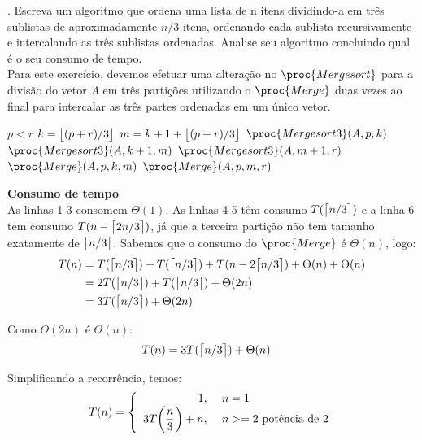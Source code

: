 . Escreva um algoritmo que ordena uma lista de n itens dividindo-a em três sublistas de aproximadamente $n/3$ itens, ordenando cada sublista recursivamente e intercalando as três sublistas ordenadas. Analise seu algoritmo concluindo qual é o seu consumo de tempo.\\[6pt]
Para este exercício, devemos efetuar uma alteração no $\proc{Mergesort}$ para a divisão do vetor $A$ em três partições utilizando o $\proc{Merge}$ duas vezes ao final para intercalar as três partes ordenadas em um único vetor.

\begin{codebox}
\li    \If $p < r$
\li         \Then
            $k = \big\lfloor(p + r) / 3\big\rfloor$
\li         $m = k+1 + \big\lfloor(p + r) / 3\big\rfloor$
\li         $\proc{Mergesort3}(A, p, k)$
\li         $\proc{Mergesort3}(A, k + 1, m)$
\li         $\proc{Mergesort3}(A, m + 1, r)$
\li         $\proc{Merge}(A, p, k, m)$
\li         $\proc{Merge}(A, p, m, r)$
            \End
\End
\end{codebox}

\textbf{Consumo de tempo}\\[6pt]
As linhas 1-3 consomem $\Theta(1)$. As linhas 4-5 têm consumo $T(\big\lceil n / 3\big\rceil)$ e a linha 6 tem consumo $T(n - \big\lceil2n / 3\big\rceil)$, já que a terceira partição não tem tamanho exatamente de $\big\lceil n / 3\big\rceil$. Sabemos que o consumo do $\proc{Merge}$ é $\Theta(n)$, logo:\\
\begin{align*}
T(n) & = T(\big\lceil n / 3\big\rceil) + T(\big\lceil n / 3\big\rceil) + T(n - 2\big\lceil n / 3\big\rceil) + \Theta(n) + \Theta(n) \\
& = 2T(\big\lceil n / 3\big\rceil) + T(\big\lceil n / 3\big\rceil) + \Theta(2n) \\
& = 3T(\big\lceil n / 3\big\rceil) + \Theta(2n)
\end{align*}

Como $\Theta(2n)$ é $\Theta(n)$:\\
\begin{align*}
T(n) & = 3T(\big\lceil n / 3\big\rceil) + \Theta(n)
\end{align*}

Simplificando a recorrência, temos:\\
\begin{eqnarray*}
T(n) = \left\{ \begin{array}{rl} 
 1, &\mbox{ $n = 1$} \\
 3T\bigg(\dfrac{n}{3}\bigg) + n, &\mbox{ $n >= 2 $ potência de 2}
       \end{array} \right.
\end{eqnarray*}

